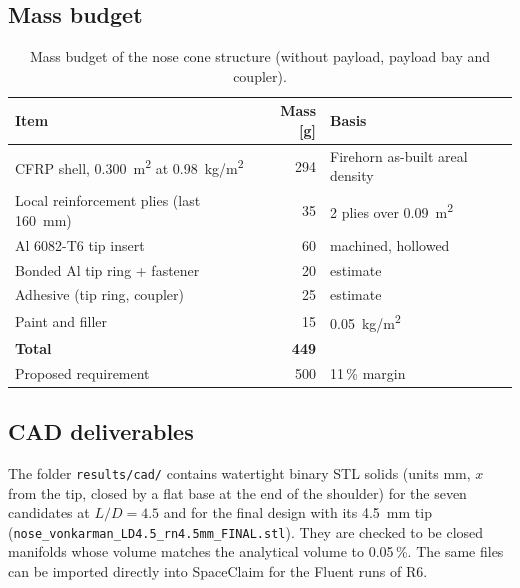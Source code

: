 \subsection{Mass budget}

\begin{table}[H]
\centering
\caption{Mass budget of the nose cone structure (without payload, payload bay and coupler).}
\label{tab:mass}
\small
\begin{tabular}{@{}lrl@{}}
\toprule
Item & Mass [g] & Basis \\
\midrule
CFRP shell, \SI{0.300}{m^2} at \SI{0.98}{kg/m^2} & 294 & Firehorn as-built areal density \\
Local reinforcement plies (last \SI{160}{mm}) & 35 & 2 plies over \SI{0.09}{m^2} \\
Al 6082-T6 tip insert & 60 & machined, hollowed \\
Bonded Al tip ring + fastener & 20 & estimate \\
Adhesive (tip ring, coupler) & 25 & estimate \\
Paint and filler & 15 & \SI{0.05}{kg/m^2} \\
\midrule
\textbf{Total} & \textbf{449} & \\
Proposed requirement & 500 & 11\,\% margin \\
\bottomrule
\end{tabular}
\end{table}

\subsection{CAD deliverables}

The folder \texttt{results/cad/} contains watertight binary STL solids (units mm, $x$ from the
tip, closed by a flat base at the end of the shoulder) for the seven candidates at $L/D = 4.5$
and for the final design with its \SI{4.5}{mm} tip
(\texttt{nose\_vonkarman\_LD4.5\_rn4.5mm\_FINAL.stl}). They are checked to be closed manifolds
whose volume matches the analytical volume to 0.05\,\%. The same files can be imported directly
into SpaceClaim for the Fluent runs of R6.
